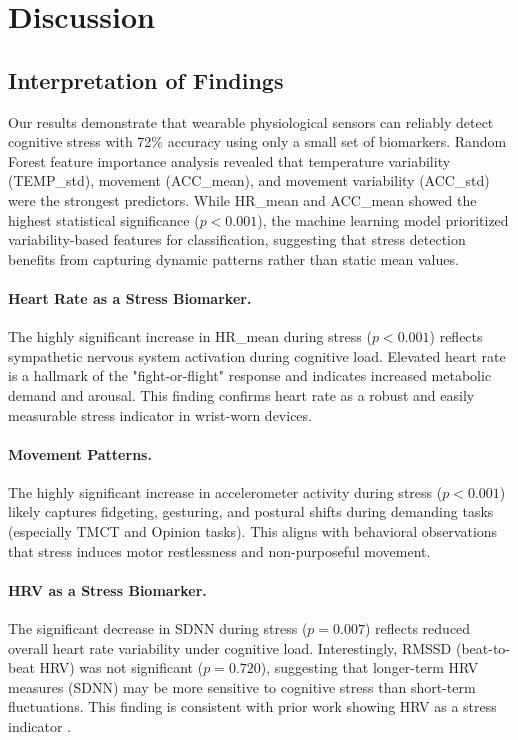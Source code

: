 \documentclass[12pt,letterpaper]{article}
\begin{document}
\section{Discussion}

\subsection{Interpretation of Findings}

Our results demonstrate that wearable physiological sensors can reliably detect cognitive stress with 72\% accuracy using only a small set of biomarkers. Random Forest feature importance analysis revealed that temperature variability (TEMP\_std), movement (ACC\_mean), and movement variability (ACC\_std) were the strongest predictors. While HR\_mean and ACC\_mean showed the highest statistical significance ($p < 0.001$), the machine learning model prioritized variability-based features for classification, suggesting that stress detection benefits from capturing dynamic patterns rather than static mean values.

\paragraph{Heart Rate as a Stress Biomarker.} The highly significant increase in HR\_mean during stress ($p < 0.001$) reflects sympathetic nervous system activation during cognitive load. Elevated heart rate is a hallmark of the "fight-or-flight" response and indicates increased metabolic demand and arousal. This finding confirms heart rate as a robust and easily measurable stress indicator in wrist-worn devices.

\paragraph{Movement Patterns.} The highly significant increase in accelerometer activity during stress ($p < 0.001$) likely captures fidgeting, gesturing, and postural shifts during demanding tasks (especially TMCT and Opinion tasks). This aligns with behavioral observations that stress induces motor restlessness and non-purposeful movement.

\paragraph{HRV as a Stress Biomarker.} The significant decrease in SDNN during stress ($p = 0.007$) reflects reduced overall heart rate variability under cognitive load. Interestingly, RMSSD (beat-to-beat HRV) was not significant ($p = 0.720$), suggesting that longer-term HRV measures (SDNN) may be more sensitive to cognitive stress than short-term fluctuations. This finding is consistent with prior work showing HRV as a stress indicator \citep{schlink2020wise, hickey2021smart}.
\end{document}
